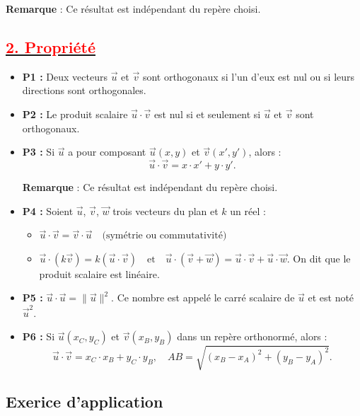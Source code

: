 \documentclass[12pt,a4paper]{article}
\begin{document}
\textbf{Remarque} : Ce résultat est indépendant du repère choisi.

\subsection*{\underline{\textbf{\textcolor{red}{2. Propriété }}}}

\begin{itemize}
    \item \textbf{P1 :} 
    Deux vecteurs $\vec{u}$ et $\vec{v}$ sont orthogonaux si l'un d'eux est nul ou si leurs directions sont orthogonales.
    
    \item \textbf{P2 :} 
    Le produit scalaire $\vec{u} \cdot \vec{v}$ est nul si et seulement si $\vec{u}$ et $\vec{v}$ sont orthogonaux.
    
    \item \textbf{P3 :} 
    Si $\vec{u}$ a pour composant $\vec{u}(x, y)$ et $\vec{v}(x', y')$, alors :
    \[
    \vec{u} \cdot \vec{v} = x \cdot x' + y \cdot y'.
    \]

\textbf{Remarque} : Ce résultat est indépendant du repère choisi.

    \item \textbf{P4 :} 
    Soient $\vec{u}$, $\vec{v}$, $\vec{w}$ trois vecteurs du plan et $k$ un réel :
\begin{itemize}
    \item \(
    \vec{u} \cdot \vec{v} = \vec{v} \cdot \vec{u} \quad \text{(symétrie ou commutativité)}
    \)
    \item \(
    \vec{u} \cdot (k \vec{v}) = k (\vec{u} \cdot \vec{v}) \quad \text{et} \quad \vec{u} \cdot (\vec{v} + \vec{w}) = \vec{u} \cdot \vec{v} + \vec{u} \cdot \vec{w}.
    \)
    On dit que le produit scalaire est linéaire.
\end{itemize}
    
    \item \textbf{P5 :} 
    $\vec{u} \cdot \vec{u} = \|\vec{u}\|^2$. Ce nombre est appelé le carré scalaire de $\vec{u}$ et est noté $\vec{u}^2$.

    \item \textbf{P6 :} 
    Si $\vec{u}(x_C, y_C)$ et $\vec{v}(x_B, y_B)$ dans un repère orthonormé, alors :
    \[
    \vec{u} \cdot \vec{v} = x_C \cdot x_B + y_C \cdot y_B, \quad AB = \sqrt{(x_B - x_A)^2 + (y_B - y_A)^2}.
    \]
\end{itemize}

\subsection*{Exerice d'application}
\end{document}
